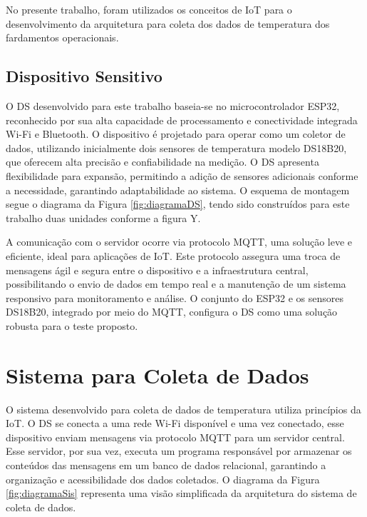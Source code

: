 	  \tab No presente trabalho, foram utilizados os conceitos de \acrlong{IoT} para o desenvolvimento da arquitetura para coleta dos dados de temperatura
	   dos fardamentos operacionais.

\subsection{Dispositivo Sensitivo}

	O \acrfull{DS} desenvolvido para este trabalho baseia-se no microcontrolador ESP32, reconhecido por sua alta capacidade de processamento e conectividade
	 integrada Wi-Fi e Bluetooth. O dispositivo é projetado para operar como um coletor de dados, utilizando inicialmente dois sensores de temperatura modelo DS18B20,
	  que oferecem alta precisão e confiabilidade na medição. O \acrshort{DS} apresenta flexibilidade para expansão, permitindo a adição de sensores adicionais conforme a
	   necessidade, garantindo adaptabilidade ao sistema. O esquema de montagem segue o diagrama da Figura \ref{fig:diagramaDS}, tendo sido construídos para
	    este trabalho duas unidades conforme a figura Y.



	\tab A comunicação com o servidor ocorre via protocolo \acrfull{MQTT}, uma solução leve e eficiente, ideal para aplicações de
	 \acrlong{IoT}. Este protocolo assegura uma troca de mensagens ágil e segura entre o dispositivo e a infraestrutura central, 
	 possibilitando o envio de dados em tempo real e a manutenção de um sistema responsivo para monitoramento e análise. O conjunto do ESP32 e
	  os sensores DS18B20, integrado por meio do \acrshort{MQTT}, configura o \acrshort{DS} como uma solução robusta para o teste proposto.
	
\section{Sistema para Coleta de Dados}

	O sistema desenvolvido para coleta de dados de temperatura utiliza princípios da \acrlong{IoT}. O \acrlong{DS} se conecta a uma rede Wi-Fi disponível e uma vez conectado, esse dispositivo enviam mensagens via protocolo \acrshort{MQTT} para um servidor central. Esse servidor, por sua vez, executa um programa responsável por armazenar os conteúdos das mensagens em um banco de dados relacional, garantindo a organização e acessibilidade dos dados coletados. O diagrama da Figura \ref{fig:diagramaSis} representa uma visão simplificada da arquitetura do sistema de coleta de dados.

